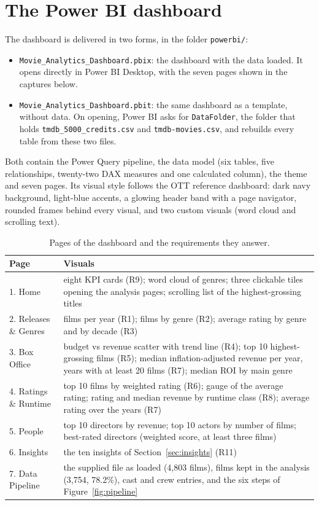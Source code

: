 \documentclass[12pt,a4paper]{article}
\begin{document}
\section{The Power BI dashboard}

The dashboard is delivered in two forms, in the folder \texttt{powerbi/}:
\begin{itemize}
\item \texttt{Movie\_Analytics\_Dashboard.pbix}: the dashboard with the data loaded. It
opens directly in Power BI Desktop, with the seven pages shown in the captures below.
\item \texttt{Movie\_Analytics\_Dashboard.pbit}: the same dashboard as a template, without
data. On opening, Power BI asks for \texttt{DataFolder}, the folder that holds
\texttt{tmdb\_5000\_credits.csv} and \texttt{tmdb-movies.csv}, and rebuilds every table
from these two files.
\end{itemize}
Both contain the Power Query pipeline, the data model (six tables, five relationships,
twenty-two DAX measures and one calculated column), the theme and seven pages. Its visual style follows the
OTT reference dashboard: dark navy background, light-blue accents, a glowing header band
with a page navigator, rounded frames behind every visual, and two custom visuals
(word cloud and scrolling text).

\begin{table}[H]\centering\small
\caption{Pages of the dashboard and the requirements they answer.}
\begin{tabularx}{\linewidth}{@{}lX@{}}
\toprule
Page & Visuals\\\midrule
1. Home & eight KPI cards (R9); word cloud of genres; three clickable tiles opening the analysis pages; scrolling list of the highest-grossing titles\\
2. Releases \& Genres & films per year (R1); films by genre (R2); average rating by genre and by decade (R3)\\
3. Box Office & budget vs revenue scatter with trend line (R4); top 10 highest-grossing films (R5); median inflation-adjusted revenue per year, years with at least 20 films (R7); median ROI by main genre\\
4. Ratings \& Runtime & top 10 films by weighted rating (R6); gauge of the average rating; rating and median revenue by runtime class (R8); average rating over the years (R7)\\
5. People & top 10 directors by revenue; top 10 actors by number of films; best-rated directors (weighted score, at least three films)\\
6. Insights & the ten insights of Section~\ref{sec:insights} (R11)\\
7. Data Pipeline & the supplied file as loaded (4{,}803 films), films kept in the analysis (3{,}754, 78.2\%), cast and crew entries, and the six steps of Figure~\ref{fig:pipeline}\\
\bottomrule
\end{tabularx}
\end{table}
\end{document}
